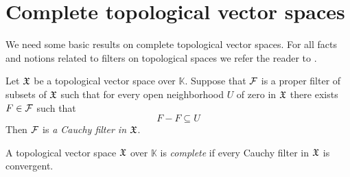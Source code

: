 \section{Complete topological vector spaces}
\noindent
We need some basic results on complete topological vector spaces. For all facts and notions related to filters on topological spaces we refer the reader to \cite{Filters_in_topology}.

\begin{definition}
   Let ${\mathfrak X}$ be a topological vector space over $\mathbb{K}$. Suppose that ${\mathcal F}$ is a proper filter of subsets of ${\mathfrak X}$ such that for every open neighborhood $U$ of zero in ${\mathfrak X}$ there exists $F \in {\mathcal F}$ such that
   $$F - F \subseteq U$$
   Then ${\mathcal F}$ is \textit{a Cauchy filter in ${\mathfrak X}$}.
\end{definition}

\begin{definition}
   A topological vector space ${\mathfrak X}$ over $\mathbb{K}$ is \textit{complete} if every Cauchy filter in ${\mathfrak X}$ is convergent.
\end{definition}

